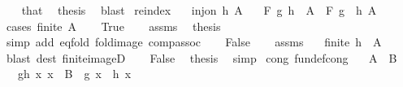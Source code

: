\begin{isabellebody}
\ \ \isamarkupfalse%
\ that\ \isamarkupfalse%
\ thesis\ \isamarkupfalse%
\ blast\isanewline
{}\isamarkupfalse%
%
\endisatagproof
{\isafoldproof}%
%
\isadelimproof
\isanewline
%
\endisadelimproof
\isanewline
{}\isamarkupfalse%
\ reindex{\isacharcolon}{\kern0pt}\isanewline
\ \ \ {\isachardoublequoteopen}inj{\isacharunderscore}{\kern0pt}on\ h\ A{\isachardoublequoteclose}\isanewline
\ \ \ {\isachardoublequoteopen}F\ g\ {\isacharparenleft}{\kern0pt}h\ {\isacharbackquote}{\kern0pt}\ A{\isacharparenright}{\kern0pt}\ {\isacharequal}{\kern0pt}\ F\ {\isacharparenleft}{\kern0pt}g\ {\isasymcirc}\ h{\isacharparenright}{\kern0pt}\ A{\isachardoublequoteclose}\isanewline
%
\isadelimproof
%
\endisadelimproof
%
\isatagproof
{}\isamarkupfalse%
\ {\isacharparenleft}{\kern0pt}cases\ {\isachardoublequoteopen}finite\ A{\isachardoublequoteclose}{\isacharparenright}{\kern0pt}\isanewline
\ \ \isamarkupfalse%
\ True\isanewline
\ \ \isamarkupfalse%
\ assms\ \isamarkupfalse%
\ {\isacharquery}{\kern0pt}thesis\isanewline
\ \ \ \ \isamarkupfalse%
\ {\isacharparenleft}{\kern0pt}simp\ add{\isacharcolon}{\kern0pt}\ eq{\isacharunderscore}{\kern0pt}fold\ fold{\isacharunderscore}{\kern0pt}image\ comp{\isacharunderscore}{\kern0pt}assoc{\isacharparenright}{\kern0pt}\isanewline
{}\isamarkupfalse%
\isanewline
\ \ \isamarkupfalse%
\ False\isanewline
\ \ \isamarkupfalse%
\ assms\ \isamarkupfalse%
\ {\isachardoublequoteopen}{\isasymnot}\ finite\ {\isacharparenleft}{\kern0pt}h\ {\isacharbackquote}{\kern0pt}\ A{\isacharparenright}{\kern0pt}{\isachardoublequoteclose}\ \isamarkupfalse%
\ {\isacharparenleft}{\kern0pt}blast\ dest{\isacharcolon}{\kern0pt}\ finite{\isacharunderscore}{\kern0pt}imageD{\isacharparenright}{\kern0pt}\isanewline
\ \ \isamarkupfalse%
\ False\ \isamarkupfalse%
\ {\isacharquery}{\kern0pt}thesis\ \isamarkupfalse%
\ simp\isanewline
{}\isamarkupfalse%
%
\endisatagproof
{\isafoldproof}%
%
\isadelimproof
\isanewline
%
\endisadelimproof
\isanewline
{}\isamarkupfalse%
\ cong\ {\isacharbrackleft}{\kern0pt}fundef{\isacharunderscore}{\kern0pt}cong{\isacharbrackright}{\kern0pt}{\isacharcolon}{\kern0pt}\isanewline
\ \ \ {\isachardoublequoteopen}A\ {\isacharequal}{\kern0pt}\ B{\isachardoublequoteclose}\isanewline
\ \ \ g{\isacharunderscore}{\kern0pt}h{\isacharcolon}{\kern0pt}\ {\isachardoublequoteopen}{\isasymAnd}x{\isachardot}{\kern0pt}\ x\ {\isasymin}\ B\ {\isasymLongrightarrow}\ g\ x\ {\isacharequal}{\kern0pt}\ h\ x{\isachardoublequoteclose}\isanewline

\end{isabellebody}
